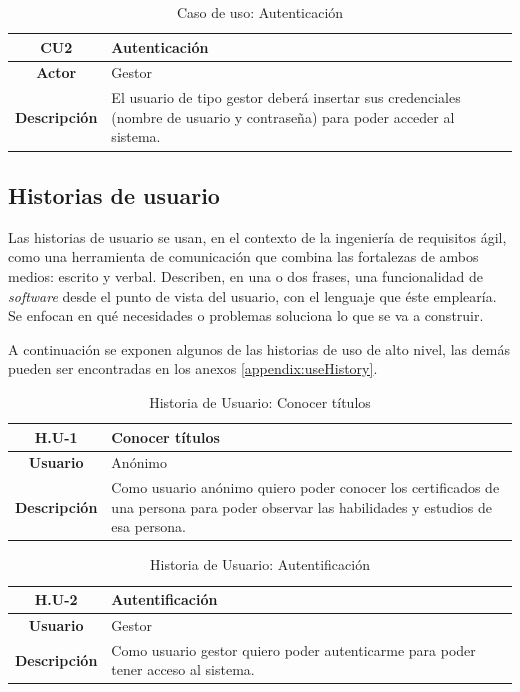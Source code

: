 \begin{table}[!h]
	\begin{center}
		\begin{tabular}{|c|p{10cm}|}
			\hline \textbf{CU2} & Autenticación \\ 
			\hline \textbf{Actor} & Gestor\\ 
			\hline \textbf{Descripción} & El usuario de tipo gestor deberá insertar sus credenciales (nombre de usuario y contraseña) para poder acceder al sistema.\\ 
			\hline 
		\end{tabular}
		\caption{Caso de uso: Autenticación}
		\label{tab:CU2}
	\end{center}
\end{table}

\subsection{Historias de usuario}
Las historias de usuario se usan, en el contexto de la ingeniería de requisitos ágil, como una herramienta de comunicación que combina las fortalezas de ambos medios: escrito y verbal. Describen, en una o dos frases, una funcionalidad de \textit{software} desde el punto de vista del usuario, con el lenguaje que éste emplearía. Se enfocan en qué necesidades o problemas soluciona lo que se va a construir.

A continuación se exponen algunos de las historias de uso de alto nivel, las demás pueden ser encontradas en los anexos \ref{appendix:useHistory}.

\begin{table}[!h]
	\begin{center}
		\begin{tabular}{|c|p{10cm}|}
			\hline \textbf{H.U-1} & Conocer títulos \\ 
			\hline \textbf{Usuario} & Anónimo\\ 
			\hline \textbf{Descripción} & Como usuario anónimo quiero poder conocer los certificados de una persona para poder observar las habilidades y estudios de esa persona. \\ 
			\hline 
		\end{tabular}
		\caption{Historia de Usuario: Conocer títulos}
		\label{tab:HU1}
	\end{center}
\end{table}

\begin{table}[!h]
	\begin{center}
		\begin{tabular}{|c|p{10cm}|}
			\hline \textbf{H.U-2} & Autentificación \\ 
			\hline \textbf{Usuario} & Gestor \\ 
			\hline \textbf{Descripción} & Como usuario gestor quiero poder autenticarme para poder tener acceso al sistema. \\ 
			\hline 
		\end{tabular}
		\caption{Historia de Usuario: Autentificación}
		\label{tab:HU2}
	\end{center}
\end{table}

